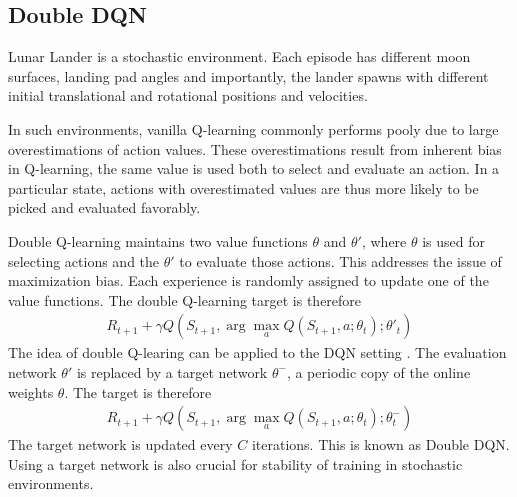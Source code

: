 \documentclass{article}
\begin{document}
\subsection{Double DQN}
Lunar Lander is a stochastic environment. Each episode has different moon surfaces, landing pad angles and importantly, the lander spawns with different initial translational and rotational positions and velocities.

In such environments, vanilla Q-learning commonly performs pooly due to large overestimations of action values. These overestimations result from inherent bias in Q-learning, the same value is used both to select and evaluate an action. In a particular state, actions with overestimated values are thus more likely to be picked and evaluated favorably.

Double Q-learning maintains two value functions $\theta$ and $\theta'$, where $\theta$ is used for selecting actions and the $\theta'$ to evaluate those actions. This addresses the issue of maximization bias. Each experience is randomly assigned to update one of the value functions. The double Q-learning target is therefore
\begin{align*}
  R_{t+1} + \gamma Q(S_{t+1}, \arg \max_a Q(S_{t+1}, a; \theta_t); \theta'_t)
\end{align*}
The idea of double Q-learing can be applied to the DQN setting \cite{Hasselt2016DeepRL}. The evaluation network $\theta'$ is replaced by a target network $\theta^{-}$, a periodic copy of the online weights $\theta$. The target is therefore
\begin{align*}
  R_{t+1} + \gamma Q(S_{t+1}, \arg \max_a Q(S_{t+1}, a; \theta_t); \theta_t^{-})
\end{align*}
The target network is updated every $C$ iterations. This is known as Double DQN. Using a target network is also crucial for stability of training in stochastic environments.
\end{document}

